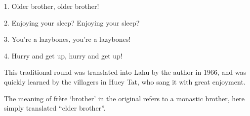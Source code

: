 \setcounter{footnote}{0}

1. Older brother, older brother!

2. Enjoying your sleep? Enjoying your sleep?

3. You're a lazybones, you're a lazybones!

4. Hurry and get up, hurry and get up!

This traditional round was translated into Lahu by the author in 1966, and was
quickly learned by the villagers in Huey Tat, who sang it with great enjoyment.

The meaning of frère `brother' in the original refers to a monastic brother, here
simply translated ``elder brother''.

